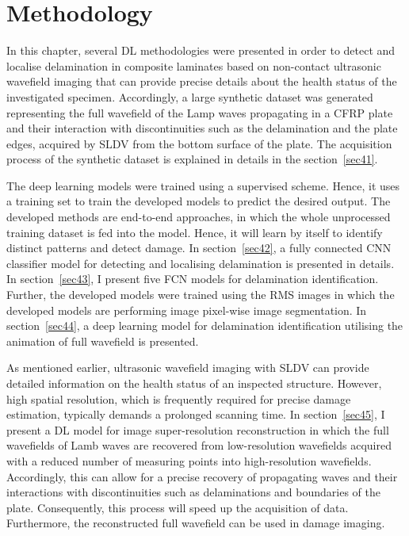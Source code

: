 \chapter[Methodology]{Methodology}
\label{ch4}

In this chapter, several DL methodologies were presented in order to detect and localise delamination in composite laminates based on non-contact ultrasonic wavefield imaging that can provide precise details about the health status of the investigated specimen.
Accordingly, a large synthetic dataset was generated representing the full wavefield of the Lamp waves propagating in a CFRP plate and their interaction with discontinuities such as the delamination and the plate edges, acquired by SLDV from the bottom surface of the plate.
The acquisition process of the synthetic dataset is explained in details in the section~\ref{sec41}.

The deep learning models were trained using a supervised scheme. 
Hence, it uses a training set to train the developed models to predict the desired output.
The developed methods are end-to-end approaches, in which the whole unprocessed training dataset is fed into the model.
Hence, it will learn by itself to identify distinct patterns and detect damage.
In section~\ref{sec42}, a fully connected CNN classifier model for detecting and localising delamination is presented in details.
In section~\ref{sec43}, I present five FCN models for delamination identification. 
Further, the developed models were trained using the RMS images in which the developed models are performing image pixel-wise image segmentation.
In section~\ref{sec44}, a deep learning model for delamination identification utilising the animation of full wavefield is presented.

As mentioned earlier, ultrasonic wavefield imaging with SLDV can provide detailed information on the health status of an inspected structure.
However, high spatial resolution, which is frequently required for precise damage estimation, typically demands a prolonged scanning time.
In section~\ref{sec45}, I present a DL model for image super-resolution reconstruction in which the full wavefields of Lamb waves are recovered from low-resolution wavefields acquired with a reduced number of measuring points into high-resolution wavefields.
Accordingly, this can allow for a precise recovery of propagating waves and their interactions with discontinuities such as delaminations and boundaries of the plate.
Consequently, this process will speed up the acquisition of data.
Furthermore, the reconstructed full wavefield can be used in damage imaging. 


